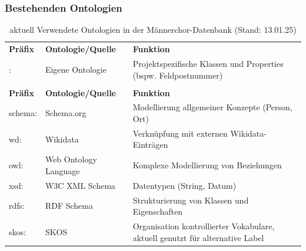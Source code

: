 \documentclass[12pt, a4paper, ngerman, bidi=default]{article}
\begin{document}
\begin{spacing}{1.5}
\begin{figure}[htbp]
\centering

\end{figure}
\newpage
\subsubsection{Bestehenden Ontologien}\label{tab:bestehenden Ontologien}
\begin{table}[h]
\centering
\renewcommand{\arraystretch}{1.3}  %
\begin{tabular}{@{}>{\ttfamily}l>{\raggedright\arraybackslash}p{5cm}>{\raggedright\arraybackslash}p{7cm}@{}}
\toprule
\rowcolor{gray!20} \multicolumn{3}{c}{\textbf{Interne Ontologien}} \\
\midrule
\textbf{Präfix} & \textbf{Ontologie/Quelle} & \textbf{Funktion} \\
\arrayrulecolor{lightgray}\midrule
: & Eigene Ontologie & Projektspezifische Klassen und Properties (bspw. Feldpostnummer)\\
\arrayrulecolor{black}\midrule
\rowcolor{gray!20} \multicolumn{3}{c}{\textbf{Externe Ontologien}} \\
\midrule
\textbf{Präfix} & \textbf{Ontologie/Quelle} & \textbf{Funktion} \\
\arrayrulecolor{lightgray}\midrule
schema: & Schema.org & Modellierung allgemeiner Konzepte (Person, Ort) \\
wd: & Wikidata & Verknüpfung mit externen Wikidata-Einträgen \\
owl: & Web Ontology Language & Komplexe Modellierung von Beziehungen \\
xsd: & W3C XML Schema & Datentypen (String, Datum) \\
rdfs: & RDF Schema & Strukturierung von Klassen und Eigenschaften \\
skos: & SKOS & Organisation kontrollierter Vokabulare, aktuell genutzt für alternative Label \\
\bottomrule
\end{tabular}
\caption{aktuell Verwendete Ontologien in der Männerchor-Datenbank (Stand: 13.01.25)}
\end{table}
\end{spacing}


\printbibliography%
\end{document}
